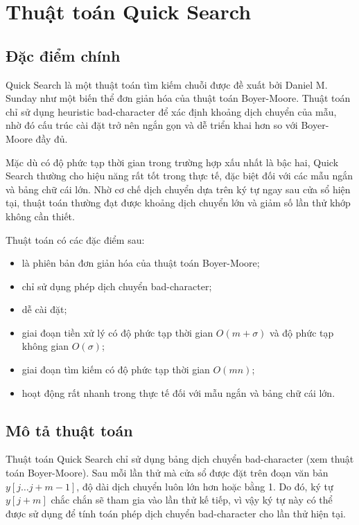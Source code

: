 \section{Thuật toán Quick Search}

\subsection{Đặc điểm chính}
Quick Search là một thuật toán tìm kiếm chuỗi được đề xuất bởi Daniel M. Sunday như một biến thể đơn giản hóa của thuật toán Boyer-Moore. Thuật toán chỉ sử dụng heuristic bad-character để xác định khoảng dịch chuyển của mẫu, nhờ đó cấu trúc cài đặt trở nên ngắn gọn và dễ triển khai hơn so với Boyer-Moore đầy đủ.

Mặc dù có độ phức tạp thời gian trong trường hợp xấu nhất là bậc hai, Quick Search thường cho hiệu năng rất tốt trong thực tế, đặc biệt đối với các mẫu ngắn và bảng chữ cái lớn. Nhờ cơ chế dịch chuyển dựa trên ký tự ngay sau cửa sổ hiện tại, thuật toán thường đạt được khoảng dịch chuyển lớn và giảm số lần thử khớp không cần thiết.

Thuật toán có các đặc điểm sau:

\begin{itemize}
    \item là phiên bản đơn giản hóa của thuật toán Boyer-Moore;
    \item chỉ sử dụng phép dịch chuyển bad-character;
    \item dễ cài đặt;
    \item giai đoạn tiền xử lý có độ phức tạp thời gian $O(m + \sigma)$ và độ phức tạp không gian $O(\sigma)$;
    \item giai đoạn tìm kiếm có độ phức tạp thời gian $O(mn)$;
    \item hoạt động rất nhanh trong thực tế đối với mẫu ngắn và bảng chữ cái lớn.
\end{itemize}

\subsection{Mô tả thuật toán}

Thuật toán Quick Search chỉ sử dụng bảng dịch chuyển bad-character 
(xem thuật toán Boyer-Moore). Sau mỗi lần thử mà cửa sổ được đặt trên 
đoạn văn bản $y[j \dots j + m - 1]$, độ dài dịch chuyển luôn lớn hơn hoặc 
bằng 1. Do đó, ký tự $y[j + m]$ chắc chắn sẽ tham gia vào lần thử kế tiếp, vì vậy 
ký tự này có thể được sử dụng để tính toán phép dịch chuyển bad-character cho 
lần thử hiện tại.

